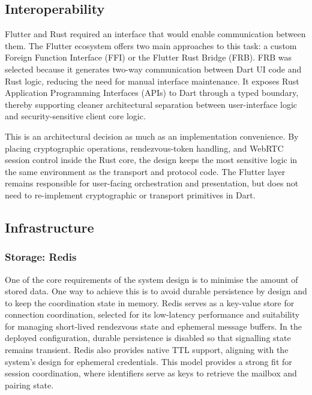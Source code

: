 \documentclass[12pt,a4paper,oneside]{report}
\begin{document}
\subsection{Interoperability}
\label{sec:interoperability}

Flutter and Rust required an interface that would enable communication between them. The Flutter ecosystem offers two main approaches to this task: a custom Foreign Function Interface (FFI) or the Flutter Rust Bridge (FRB). FRB was selected because it generates two-way communication between Dart UI code and Rust logic, reducing the need for manual interface maintenance. It exposes Rust Application Programming Interfaces (APIs) to Dart through a typed boundary, thereby supporting cleaner architectural separation between user-interface logic and security-sensitive client core logic.

This is an architectural decision as much as an implementation convenience. By placing cryptographic operations, rendezvous-token handling, and WebRTC session control inside the Rust core, the design keeps the most sensitive logic in the same environment as the transport and protocol code. The Flutter layer remains responsible for user-facing orchestration and presentation, but does not need to re-implement cryptographic or transport primitives in Dart.


\subsection{Infrastructure}
\label{sec:infrastructure}

\subsubsection{Storage: Redis}
\label{sec:storage-redis}

One of the core requirements of the system design is to minimise the amount of stored data. One way to achieve this is to avoid durable persistence by design and to keep the coordination state in memory. Redis serves as a key-value store for connection coordination, selected for its low-latency performance and suitability for managing short-lived rendezvous state and ephemeral message buffers. In the deployed configuration, durable persistence is disabled so that signalling state remains transient. Redis also provides native TTL support, aligning with the system's design for ephemeral credentials. This model provides a strong fit for session coordination, where identifiers serve as keys to retrieve the mailbox and pairing state.
\end{document}
